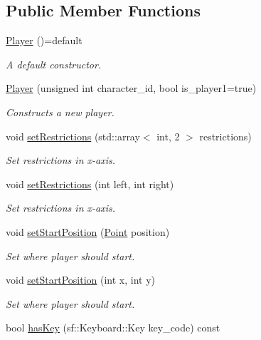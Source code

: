 \subsection*{Public Member Functions}
\begin{DoxyCompactItemize}
\item 
\hyperlink{classPlayer_aaa23b3bf80e8c0267cf08d4fe4d6ddc1}{Player} ()=default
\begin{DoxyCompactList}\small\item\em A default constructor. \end{DoxyCompactList}\item 
\hyperlink{classPlayer_aaaf437645956b7fd7e0acc28b64d0ae4}{Player} (unsigned int character\+\_\+id, bool is\+\_\+player1=true)
\begin{DoxyCompactList}\small\item\em Constructs a new player. \end{DoxyCompactList}\item 
void \hyperlink{classPlayer_acadddee1df9fd4fcf1a1bcca7f8b0149}{set\+Restrictions} (std\+::array$<$ int, 2 $>$ restrictions)
\begin{DoxyCompactList}\small\item\em Set restrictions in x-\/axis. \end{DoxyCompactList}\item 
void \hyperlink{classPlayer_ad3a9bf907eed07ee7ec3e2caddbb7c01}{set\+Restrictions} (int left, int right)
\begin{DoxyCompactList}\small\item\em Set restrictions in x-\/axis. \end{DoxyCompactList}\item 
void \hyperlink{classPlayer_ad61f1f07cc8e7faed52cd055a98a03d3}{set\+Start\+Position} (\hyperlink{structPoint}{Point} position)
\begin{DoxyCompactList}\small\item\em Set where player should start. \end{DoxyCompactList}\item 
void \hyperlink{classPlayer_a278252ff033b18ee6a5d9f2da5ca4fe0}{set\+Start\+Position} (int x, int y)
\begin{DoxyCompactList}\small\item\em Set where player should start. \end{DoxyCompactList}\item 
bool \hyperlink{classPlayer_a8ad2d6057db638b755b89347fbce25bb}{has\+Key} (sf\+::\+Keyboard\+::\+Key key\+\_\+code) const

\end{DoxyCompactItemize}
